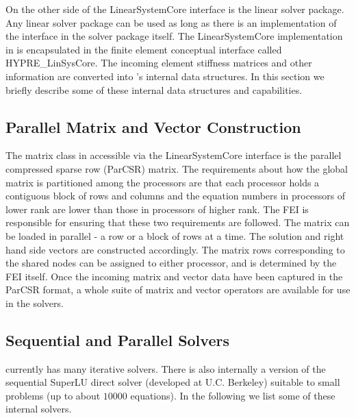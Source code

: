On the other side of the {\sf LinearSystemCore} interface is the linear
solver package. Any linear solver package can be used as long as there
is an implementation of the interface in the solver package itself. The
{\sf LinearSystemCore} implementation in \hypre{} is encapsulated in the
\hypre{} finite element conceptual interface called {\sf HYPRE\_LinSysCore}.
The incoming element stiffness matrices and other information are
converted into \hypre{}'s internal data structures. In this section we
briefly describe some of these internal data structures and capabilities.
                                                                                
\subsection{Parallel Matrix and Vector Construction}
                                                                                
The matrix class in \hypre{} accessible via the {\sf LinearSystemCore}
interface is the parallel compressed sparse row ({\sf ParCSR}) matrix.
The requirements about how the global matrix is partitioned among the
processors are that each processor holds a contiguous block of rows and
columns and the equation numbers in processors of lower rank are lower
than those in processors of higher rank.  The FEI is responsible for
ensuring that these two requirements are followed. The matrix can be
loaded in parallel - a row or a block of rows at a time.  The solution
and right hand side vectors are constructed accordingly. The matrix rows
corresponding to the shared nodes can be assigned to either processor, 
and is determined by the FEI itself. Once the incoming matrix and vector
data have been captured in the \hypre{} {\sf ParCSR} format, a whole 
suite of matrix and vector operators are available for use in the \hypre{}
solvers.
                                                                                
\subsection{Sequential and Parallel Solvers}
                                                                                
\hypre{} currently has many iterative solvers. There is also internally a
version of the sequential {\sf SuperLU} direct solver (developed at U.C.
Berkeley) suitable to small problems (up to about $10000$ equations).
In the following we list some of these internal solvers.
                                                                                
